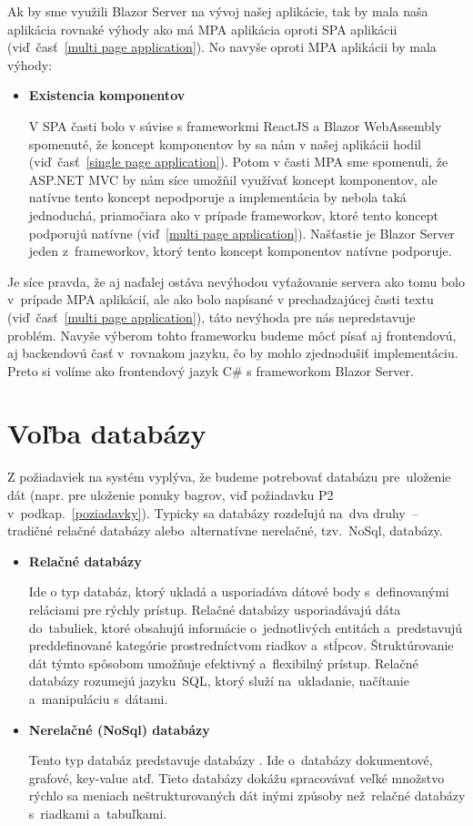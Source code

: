 Ak by sme využili Blazor Server na vývoj našej aplikácie, tak by mala naša aplikácia rovnaké výhody ako má MPA aplikácia oproti SPA aplikácii (viď~časť~\ref{multi page application}). No navyše oproti MPA aplikácii by mala výhody:

\begin{itemize}
\item \textbf{Existencia komponentov}

V SPA časti bolo v súvise s frameworkmi ReactJS a Blazor WebAssembly spomenuté, že koncept komponentov by sa nám v našej aplikácii hodil (viď~časť~\ref{single page application}). Potom v časti MPA sme spomenuli, že ASP.NET MVC by nám síce umožňil využívať koncept komponentov, ale natívne tento koncept nepodporuje a implementácia by nebola taká jednoduchá, priamočiara ako v prípade frameworkov, ktoré tento koncept podporujú natívne (viď~\ref{multi page application}). Našťastie je Blazor Server jeden z~frameworkov, ktorý tento koncept komponentov natívne podporuje.
\end{itemize}

Je síce pravda, že aj naďalej ostáva nevýhodou vyťažovanie servera ako tomu bolo v~prípade MPA aplikácií, ale ako bolo napísané v prechadzajúcej časti textu (viď~časť~\ref{multi page application}), táto nevýhoda pre nás nepredstavuje problém. Navyše výberom tohto frameworku budeme môcť písať aj frontendovú, aj backendovú časť v~rovnakom jazyku, čo by mohlo zjednodušiť implementáciu. Preto si volíme ako frontendový jazyk C\# s frameworkom Blazor Server.

\section{Voľba databázy}
\label{volba databazy}

Z požiadaviek na systém vyplýva, že budeme potrebovať databázu pre~uloženie dát (napr. pre uloženie ponuky bagrov, viď požiadavku P2 v~podkap.~\ref{poziadavky}). Typicky sa databázy rozdeľujú na~dva druhy~-- tradičné relačné databázy alebo~alternatívne nerelačné, tzv.~NoSql, databázy.

\begin{itemize}
\item \textbf{Relačné databázy~\cite{relational db}}

Ide o typ databáz, ktorý ukladá a usporiadáva dátové body s~definovanými reláciami pre rýchly prístup. Relačné databázy usporiadávajú dáta do~tabuliek, ktoré obsahujú informácie o~jednotlivých entitách a~predstavujú preddefinované kategórie prostredníctvom riadkov a~stĺpcov. Štruktúrovanie dát týmto spôsobom umožňuje efektivný a~flexibilný prístup. Relačné databázy rozumejú jazyku~SQL, ktorý služí na~ukladanie, načítanie a~manipuláciu s~dátami.

\item \textbf{Nerelačné (NoSql) databázy~\cite{nosql db}}

Tento typ databáz predstavuje databázy . Ide o~databázy dokumentové, grafové, key-value atď. Tieto databázy dokážu spracovávať veľké množstvo rýchlo sa meniach neštrukturovaných dát inými způsoby než~relačné databázy s~riadkami a~tabuľkami.
\end{itemize}

